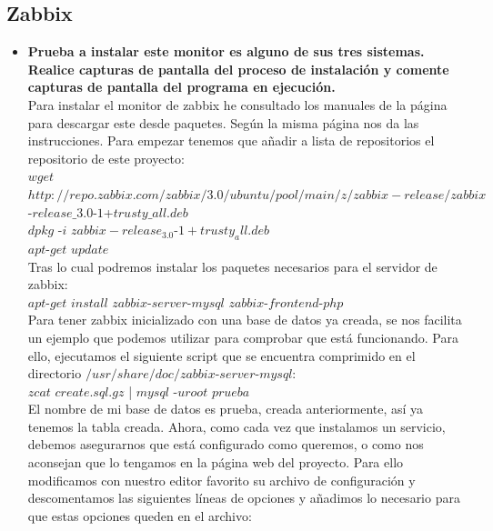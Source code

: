 \subsection{Zabbix}
\begin{itemize}
	\item \textbf{Prueba a instalar este monitor es alguno de sus tres sistemas. Realice capturas de pantalla del proceso de instalación y comente capturas de pantalla del programa en ejecución.}\\
	
	Para instalar el monitor de zabbix he consultado los manuales de la página\cite{zabbix} para descargar este desde paquetes. Según la misma página nos da las instrucciones. Para empezar tenemos que añadir a lista de repositorios el repositorio de este proyecto:\\
	
	$wget$ $http://repo.zabbix.com/zabbix/3.0/ubuntu/pool/main/z/zabbix-release/zabbix$-$	release\_3$.$0$-$1$+$trusty\_all.deb$ \\
	$dpkg$ -$i$ $zabbix-release_3.0$-$1+trusty_all.deb$\\
	$apt$-$get$ $update$\\
	
	Tras lo cual podremos instalar los paquetes necesarios para el servidor de zabbix:\\
	
	$apt$-$get$ $install$ $zabbix$-$server$-$mysql$ $zabbix$-$frontend$-$php$\\
	
	Para tener zabbix inicializado con una base de datos ya creada, se nos facilita un ejemplo que podemos utilizar para comprobar que está funcionando. Para ello, ejecutamos el siguiente script que se encuentra comprimido en el directorio $/usr/share/doc/zabbix$-$server$-$mysql$:\\
	
	$zcat$ $create.sql.gz$ | $mysql$ -$uroot$ $prueba$\\
	
	El nombre de mi base de datos es prueba, creada anteriormente, así ya tenemos la tabla creada. Ahora, como cada vez que instalamos un servicio, debemos asegurarnos que está configurado como queremos, o como nos aconsejan que lo tengamos en la página web del proyecto. Para ello modificamos con nuestro editor favorito su archivo de configuración y descomentamos las siguientes líneas de opciones y añadimos lo necesario para que estas opciones queden en el archivo:\\


\end{itemize}
